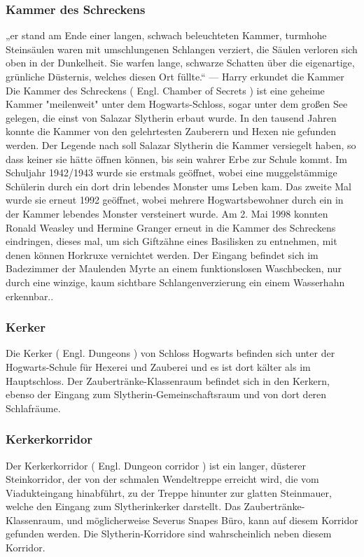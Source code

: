 \documentclass[a4paper, 10pt]{article}
\begin{document}
\subsubsection*{\large Kammer des Schreckens}
„er stand am Ende einer langen, schwach beleuchteten Kammer, turmhohe Steinsäulen waren mit umschlungenen Schlangen verziert, die Säulen verloren sich oben in der Dunkelheit. Sie warfen lange, schwarze Schatten über die eigenartige, grünliche Düsternis, welches diesen Ort füllte.“
\vspace{10pt}
\newline
— Harry erkundet die Kammer
\vspace{10pt}
\newline
Die Kammer des Schreckens (  Engl.  Chamber of Secrets ) ist eine geheime Kammer "meilenweit" unter dem Hogwarts-Schloss, sogar unter dem großen See gelegen, die einst von Salazar Slytherin erbaut wurde. In den tausend Jahren konnte die Kammer von den gelehrtesten Zauberern und Hexen nie gefunden werden. Der Legende nach soll Salazar Slytherin die Kammer versiegelt haben, so dass keiner sie hätte öffnen können, bis sein wahrer Erbe zur Schule kommt. Im Schuljahr 1942/1943 wurde sie erstmals geöffnet, wobei eine muggelstämmige Schülerin durch ein dort drin lebendes Monster ums Leben kam. Das zweite Mal wurde sie erneut 1992 geöffnet, wobei mehrere Hogwartsbewohner durch ein in der Kammer lebendes Monster versteinert wurde. Am 2. Mai 1998 konnten Ronald Weasley und Hermine Granger erneut in die Kammer des Schreckens eindringen, dieses mal, um sich Giftzähne eines Basilisken zu entnehmen, mit denen können Horkruxe vernichtet werden.
\vspace{10pt}
\newline
Der Eingang befindet sich im Badezimmer der Maulenden Myrte an einem funktionslosen Waschbecken, nur durch eine winzige, kaum sichtbare Schlangenverzierung ein einem Wasserhahn erkennbar..
\subsubsection*{\large Kerker}
Die Kerker (  Engl.  Dungeons ) von Schloss Hogwarts befinden sich unter der Hogwarts-Schule für Hexerei und Zauberei und es ist dort kälter als im Hauptschloss. Der Zaubertränke-Klassenraum befindet sich in den Kerkern, ebenso der Eingang zum Slytherin-Gemeinschaftsraum und von dort deren Schlafräume.
\subsubsection*{\large Kerkerkorridor}
Der Kerkerkorridor (  Engl.  Dungeon corridor ) ist ein langer, düsterer Steinkorridor, der von der schmalen Wendeltreppe erreicht wird, die vom Viadukteingang hinabführt, zu der Treppe hinunter zur glatten Steinmauer, welche den Eingang zum Slytherinkerker darstellt. Das Zaubertränke-Klassenraum, und möglicherweise Severus Snapes Büro, kann auf diesem Korridor gefunden werden. Die Slytherin-Korridore sind wahrscheinlich neben diesem Korridor.
\end{document}
